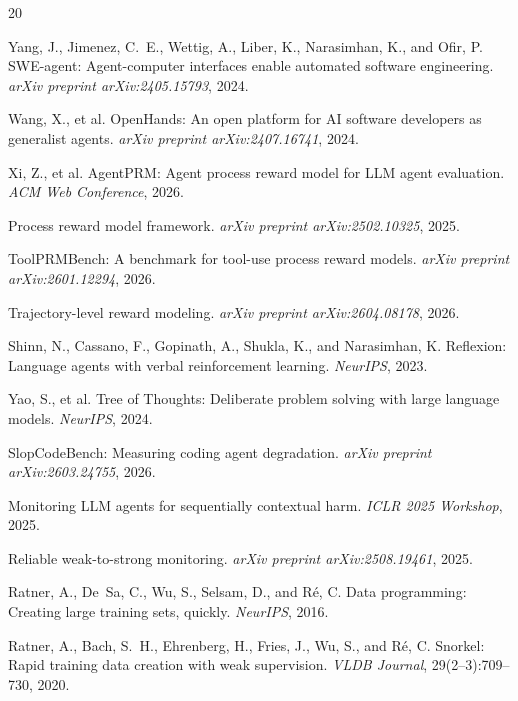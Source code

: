 \documentclass[11pt]{article}
\begin{document}

\begin{thebibliography}{20}

Yang, J., Jimenez, C.~E., Wettig, A., Liber, K., Narasimhan, K., and Ofir, P.
\newblock SWE-agent: Agent-computer interfaces enable automated software engineering.
\newblock \emph{arXiv preprint arXiv:2405.15793}, 2024.

Wang, X., et al.
\newblock OpenHands: An open platform for AI software developers as generalist agents.
\newblock \emph{arXiv preprint arXiv:2407.16741}, 2024.

Xi, Z., et al.
\newblock AgentPRM: Agent process reward model for LLM agent evaluation.
\newblock \emph{ACM Web Conference}, 2026.

Process reward model framework.
\newblock \emph{arXiv preprint arXiv:2502.10325}, 2025.

ToolPRMBench: A benchmark for tool-use process reward models.
\newblock \emph{arXiv preprint arXiv:2601.12294}, 2026.

Trajectory-level reward modeling.
\newblock \emph{arXiv preprint arXiv:2604.08178}, 2026.

Shinn, N., Cassano, F., Gopinath, A., Shukla, K., and Narasimhan, K.
\newblock Reflexion: Language agents with verbal reinforcement learning.
\newblock \emph{NeurIPS}, 2023.

Yao, S., et al.
\newblock Tree of Thoughts: Deliberate problem solving with large language models.
\newblock \emph{NeurIPS}, 2024.

SlopCodeBench: Measuring coding agent degradation.
\newblock \emph{arXiv preprint arXiv:2603.24755}, 2026.

Monitoring LLM agents for sequentially contextual harm.
\newblock \emph{ICLR 2025 Workshop}, 2025.

Reliable weak-to-strong monitoring.
\newblock \emph{arXiv preprint arXiv:2508.19461}, 2025.

Ratner, A., De~Sa, C., Wu, S., Selsam, D., and R{\'e}, C.
\newblock Data programming: Creating large training sets, quickly.
\newblock \emph{NeurIPS}, 2016.

Ratner, A., Bach, S.~H., Ehrenberg, H., Fries, J., Wu, S., and R{\'e}, C.
\newblock Snorkel: Rapid training data creation with weak supervision.
\newblock \emph{VLDB Journal}, 29(2--3):709--730, 2020.

\end{thebibliography}
\end{document}
